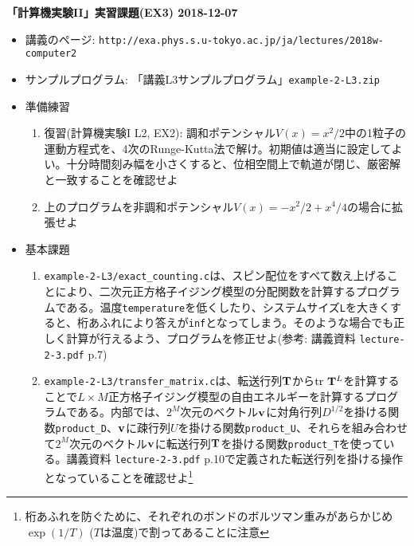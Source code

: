 \documentclass{jarticle}
\begin{document}
\noindent
{\bf\large 「計算機実験II」実習課題(EX3) 2018-12-07}
\\[-0.5em]

\noindent
\begin{itemize}
\item 講義のページ: \verb+http://exa.phys.s.u-tokyo.ac.jp/ja/lectures/2018w-computer2+

\item サンプルプログラム: 「講義L3サンプルプログラム」{\tt example-2-L3.zip}

\item 準備練習


\begin{enumerate}
\item 復習(計算機実験I L2, EX2): 調和ポテンシャル$V(x)=x^2/2$中の1粒子の運動方程式を、4次のRunge-Kutta法で解け。初期値は適当に設定してよい。十分時間刻み幅を小さくすると、位相空間上で軌道が閉じ、厳密解と一致することを確認せよ
\item 上のプログラムを非調和ポテンシャル$V(x)=-x^2/2+x^4/4$の場合に拡張せよ
\end{enumerate}

\item 基本課題
  \begin{enumerate}
  \item {\tt example-2-L3/exact\_counting.c}は、スピン配位をすべて数え上げることにより、二次元正方格子イジング模型の分配関数を計算するプログラムである。温度{\tt temperature}を低くしたり、システムサイズ{\tt L}を大きくすると、桁あふれにより答えが{\tt inf}となってしまう。そのような場合でも正しく計算が行えるよう、プログラムを修正せよ(参考: 講義資料 {\tt lecture-2-3.pdf} p.7)
  \item {\tt example-2-L3/transfer\_matrix.c}は、転送行列${\bf T}$から${\rm tr}\ {\bf T}^L$を計算することで$L \times M$正方格子イジング模型の自由エネルギーを計算するプログラムである。内部では、$2^M$次元のベクトル${\bf v}$に対角行列$D^{1/2}$を掛ける関数{\tt product\_D}、${\bf v}$に疎行列$U$を掛ける関数{\tt product\_U}、それらを組み合わせて$2^M$次元のベクトル${\bf v}$に転送行列${\bf T}$を掛ける関数{\tt product\_T}を使っている。講義資料 {\tt lecture-2-3.pdf} p.10で定義された転送行列を掛ける操作となっていることを確認せよ\footnote{桁あふれを防ぐために、それぞれのボンドのボルツマン重みがあらかじめ$\exp(1/T)$ ($T$は温度)で割ってあることに注意}


\end{enumerate}
\end{itemize}
\end{document}
